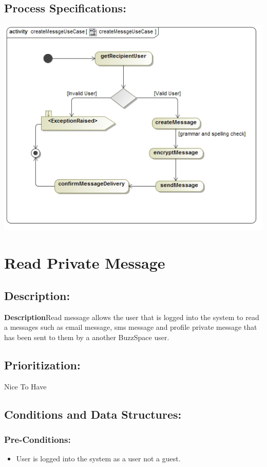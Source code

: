 \documentclass[a4paper,11pt]{article}
\begin{document}
\subsection{Process Specifications:} 
\includegraphics[width=1\linewidth]{./Images/PrivateMessage/createMessgeActivity}

\section{Read Private Message}
\subsection*{Description:}
\textbf{Description}Read message allows the user that is logged into the system to read a messages such as email message, sms message and profile private message that has been sent to them by a another BuzzSpace user.
\subsection{Prioritization:} 
\textbf{}Nice To Have
\subsection{Conditions and Data Structures:}
\subsubsection*{Pre-Conditions:}
\begin{itemize}
\item User is logged into the system as a user not a guest. 
\end{itemize}
\end{document}
